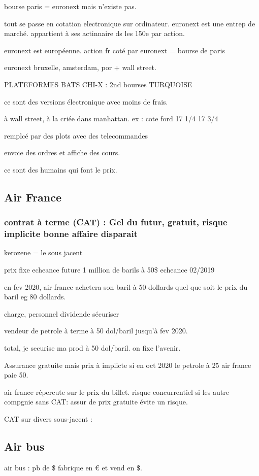 \documentclass[a4paper,12pt]{article}
\begin{document}
bourse paris = euronext mais n'existe pas.

tout se passe en cotation electronique sur ordinateur.
euronext est une entrep de marché. appartient à ses actinnaire ds les 150e par action.

euronext est européenne.
action fr coté par euronext = bourse de paris

euronext bruxelle, amsterdam, por + wall street.
 
 
 PLATEFORMES
 BATS
 CHI-X : 2nd bourses 
 TURQUOISE
 
 ce sont des versions électronique avec moins de frais.
 
 à wall street, à la criée dans manhattan.
 ex : cote ford 17 1/4  
 17 3/4
 
 remplcé par des plots avec des telecommandes
 
 envoie des ordres et affiche des cours.
 
 ce sont des humains qui font le prix.
 
 
 
 
\subsection{Air France}


\subsubsection{contrat à terme (CAT) : Gel du futur, gratuit, risque implicite bonne affaire disparait}
kerozene = le sous jacent

prix fixe echeance future
1 million de barils à 50\$  echeance 02/2019

en fev 2020, air france achetera son baril à 50 dollards quel que  soit le prix du baril eg 80 dollards.

charge, personnel dividende
sécuriser 

vendeur de petrole à terme à 50 dol/baril jusqu'à fev 2020.

total, je securise ma prod à 50 dol/baril. on fixe l'avenir.

Assurance gratuite mais prix à implicte si en oct 2020 le petrole à 25 air france paie 50.

air france répercute sur le prix du billet.
risque concurrentiel si les autre compgnie sans CAT: assur de prix gratuite évite un risque.

CAT sur divers sous-jacent :


\subsection{Air bus}
air bus : pb de \$  fabrique en € et vend en \$.
\end{document}

